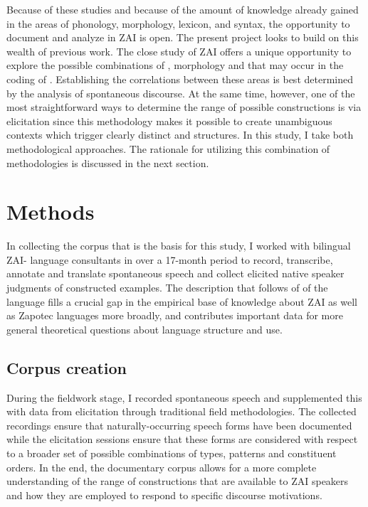 Because of these studies and because of the amount of knowledge already gained in the areas of phonology, morphology, lexicon, and syntax, the opportunity to document and analyze  in ZAI is open. The present project looks to build on this wealth of previous work. The close study of ZAI offers a unique opportunity to explore the possible combinations of , morphology and  that may occur in the coding of . Establishing the correlations between these areas is best determined by the analysis of spontaneous discourse. At the same time, however, one of the most straightforward ways to determine the range of possible constructions is via elicitation since this methodology makes it possible to create unambiguous contexts which trigger clearly distinct  and  structures. In this study, I take both methodological approaches. The rationale for utilizing this combination of methodologies is discussed in the next section.


\section{Methods}

\largerpage[-1]
In collecting the corpus that is the basis for this study, I worked with bilingual ZAI- language consultants in  over a 17-month period to record, transcribe, annotate and translate spontaneous speech and collect elicited native speaker judgments of constructed examples. The description that follows of  of the language fills a crucial gap in the empirical base of knowledge about ZAI as well as Zapotec languages more broadly, and contributes important data for more general theoretical questions about language structure and use.

\subsection{Corpus creation}

During the fieldwork stage, I recorded spontaneous speech and supplemented this with data from elicitation through traditional field methodologies. The collected recordings ensure that naturally-occurring speech forms have been documented while the elicitation sessions  ensure that these forms are considered with respect to a broader set of possible combinations of  types,  patterns and constituent orders. In the end, the documentary corpus allows for a more complete understanding of the range of constructions that are available to ZAI speakers and how they are employed to respond to specific discourse motivations.

